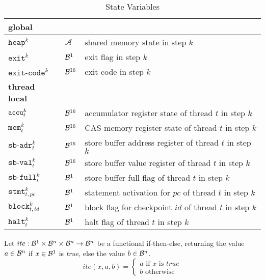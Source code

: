 \renewcommand{\arraystretch}{1.25}
\begin{table}[h!]
\begin{tabular}{lll}
  \hline
  \textbf{global} &&\\
  \hline
  $\texttt{heap}^k$ & $\mathcal{A}$ & shared memory state in step $k$ \\
  $\texttt{exit}^k$ & $\bvsort[1]$ & exit flag in step $k$ \\
  $\texttt{exit-code}^k$ & $\bvsort$ & exit code in step $k$ \\
  \hline
  \textbf{thread local} &&\\
  \hline
  $\accu^k_t$ & $\bvsort$ & accumulator register state of thread $t$ in step $k$ \\
  $\texttt{mem}^k_t$ & $\bvsort$ & CAS memory register state of thread $t$ in step $k$ \\
  $\texttt{sb-adr}^k_t$ & $\bvsort$ & store buffer address register of thread $t$ in step $k$ \\
  $\texttt{sb-val}^k_t$ & $\bvsort$ & store buffer value register of thread $t$ in step $k$ \\
  $\texttt{sb-full}^k_t$ & $\bvsort[1]$ & store buffer full flag of thread $t$ in step $k$ \\
  $\texttt{stmt}^k_{t, pc}$ & $\bvsort[1]$ & statement activation for $pc$ of thread $t$ in step $k$ \\
  $\texttt{block}^k_{t, id}$ & $\bvsort[1]$ & block flag for checkpoint $id$ of thread $t$ in step $k$ \\
  $\texttt{halt}^k_t$ & $\bvsort[1]$ & halt flag of thread $t$ in step $k$ \\
  \hline
\end{tabular}
\caption{State Variables}
\end{table}



Let $ite: \bvsort[1] \times \bvsort[n] \times \bvsort[n] \to \bvsort[n]$ be a functional if-then-else, returning the value $a \in \bvsort[n]$ if $x \in \bvsort[1]$ is \emph{true}, else the value $b \in \bvsort[n]$.
\[
  ite(x, a, b) =
  \begin{cases}
    a \text{ if } x \text{ is } true \\
    b \text{ otherwise}
  \end{cases}
\]

